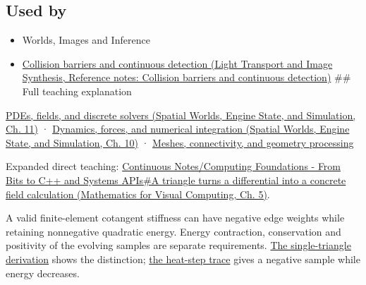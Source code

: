 \subsection{Used by}\label{appendix-1988d465c119-used-by}

\hypertarget{appendix-1988d465c119-used-by}{}

\begin{itemize}
\item
  {Worlds, Images and Inference}
\item
  \href{../04-Light-Transport-and-Image-Synthesis/main.pdf\#nameddest=appendix-a9ba01fa72a6}{Collision barriers and continuous detection (Light Transport and Image Synthesis, Reference notes: Collision barriers and continuous detection)} \#\# Full teaching explanation
\end{itemize}

\href{../05-Spatial-Worlds-Engine-State-and-Simulation/main.pdf\#nameddest=04-visual-computing-ii-ch030-pdes-fields-and-discrete-solvers}{PDEs, fields, and discrete solvers (Spatial Worlds, Engine State, and Simulation, Ch. 11)} · \href{../05-Spatial-Worlds-Engine-State-and-Simulation/main.pdf\#nameddest=04-visual-computing-ii-ch029-dynamics-forces-and-numerical-integration}{Dynamics, forces, and numerical integration (Spatial Worlds, Engine State, and Simulation, Ch. 10)} · \hyperref[03-visual-computing-i-ch002-meshes-connectivity-and-geometry-processing]{Meshes, connectivity, and geometry processing}

Expanded direct teaching: \href{../02-Mathematics-for-Visual-Computing/main.pdf\#nameddest=02-foundations-ii-ch021-a-triangle-turns-a-differential-into-a-concrete-field-calculation}{Continuous Notes/Computing Foundations - From Bits to C++ and Systems APIs\#A triangle turns a differential into a concrete field calculation (Mathematics for Visual Computing, Ch. 5)}.

A valid finite-element cotangent stiffness can have negative edge weights while retaining nonnegative quadratic energy. Energy contraction, conservation and positivity of the evolving samples are separate requirements. \hyperref[03-visual-computing-i-ch002-nonnegative-energy-and-nonnegative-weights-are-different-promises]{The single-triangle derivation} shows the distinction; \hyperref[03-visual-computing-i-ch002-a-stable-heat-step-can-still-create-a-negative-sample]{the heat-step trace} gives a negative sample while energy decreases.
